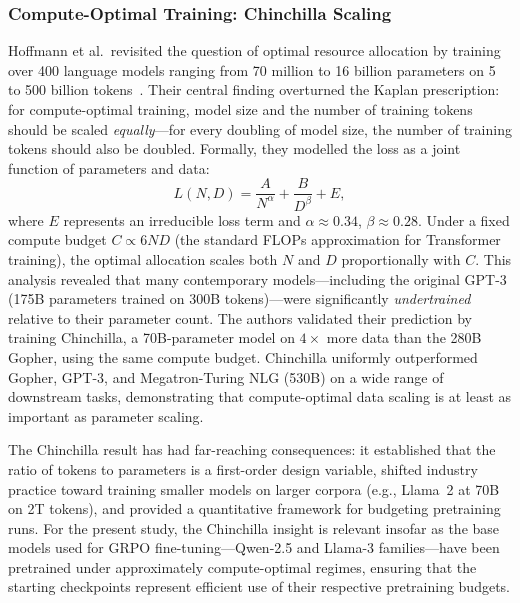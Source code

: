 \subsubsection{Compute-Optimal Training: Chinchilla Scaling}

Hoffmann et al.\ revisited the question of optimal resource allocation by
training over 400 language models ranging from 70 million to 16 billion
parameters on 5 to 500 billion tokens~\cite{hoffmann2022chinchilla}.  Their
central finding overturned the Kaplan prescription: for compute-optimal
training, model size and the number of training tokens should be scaled
\emph{equally}---for every doubling of model size, the number of training tokens
should also be doubled.  Formally, they modelled the loss as a joint function of
parameters and data:
\begin{equation}
  L(N, D) = \frac{A}{N^{\alpha}} + \frac{B}{D^{\beta}} + E,
  \label{eq:chinchilla}
\end{equation}
where $E$ represents an irreducible loss term and $\alpha \approx 0.34$,
$\beta \approx 0.28$.  Under a fixed compute budget $C \propto 6ND$ (the
standard FLOPs approximation for Transformer training), the optimal allocation
scales both $N$ and $D$ proportionally with $C$.  This analysis revealed that
many contemporary models---including the original GPT-3 (175B parameters
trained on 300B tokens)---were significantly \emph{undertrained} relative to
their parameter count.  The authors validated their prediction by training
Chinchilla, a 70B-parameter model on $4\times$ more data than the 280B Gopher,
using the same compute budget.  Chinchilla uniformly outperformed Gopher,
GPT-3, and Megatron-Turing NLG (530B) on a wide range of downstream tasks,
demonstrating that compute-optimal data scaling is at least as important as
parameter scaling.

The Chinchilla result has had far-reaching consequences: it established that
the ratio of tokens to parameters is a first-order design variable, shifted
industry practice toward training smaller models on larger corpora (e.g.,
Llama~2 at 70B on 2T tokens), and provided a quantitative framework for
budgeting pretraining runs.  For the present study, the Chinchilla insight is
relevant insofar as the base models used for GRPO fine-tuning---Qwen-2.5 and
Llama-3 families---have been pretrained under approximately compute-optimal
regimes, ensuring that the starting checkpoints represent efficient use of their
respective pretraining budgets.

